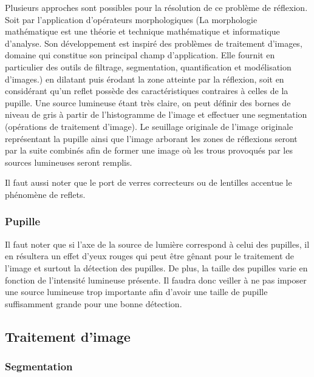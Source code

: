 Plusieurs approches sont possibles pour la résolution de ce problème de réflexion. Soit par l’application d’opérateurs morphologiques (La morphologie mathématique est une théorie et technique mathématique et informatique d'analyse. Son développement est inspiré des problèmes de traitement d'images, domaine qui constitue son principal champ d'application. Elle fournit en particulier des outils de filtrage, segmentation, quantification et modélisation d'images.) en dilatant puis érodant la zone atteinte par la réflexion, soit en considérant qu’un reflet possède des caractéristiques contraires à celles de la pupille. Une source lumineuse étant très claire, on peut définir des bornes de niveau de gris à partir de l’histogramme de l’image et effectuer une segmentation (opérations de traitement d’image). Le seuillage originale de l’image originale représentant la pupille ainsi que l’image arborant les zones de réflexions seront par la suite combinés afin de former une image où les trous provoqués par les sources lumineuses seront remplis.

Il faut aussi noter que le port de verres correcteurs ou de lentilles accentue le phénomène de reflets.

\subsubsection{Pupille}

Il faut noter que si l’axe de la source de lumière correspond à celui des pupilles, il en résultera un effet d’yeux rouges qui peut être gênant pour le traitement de l’image et surtout la détection des pupilles. De plus, la taille des pupilles varie en fonction de l’intensité lumineuse présente. Il faudra donc veiller à ne pas imposer une source lumineuse trop importante afin d’avoir une taille de pupille suffisamment grande pour une bonne détection.

\subsection{Traitement d’image}

\subsubsection{Segmentation}

